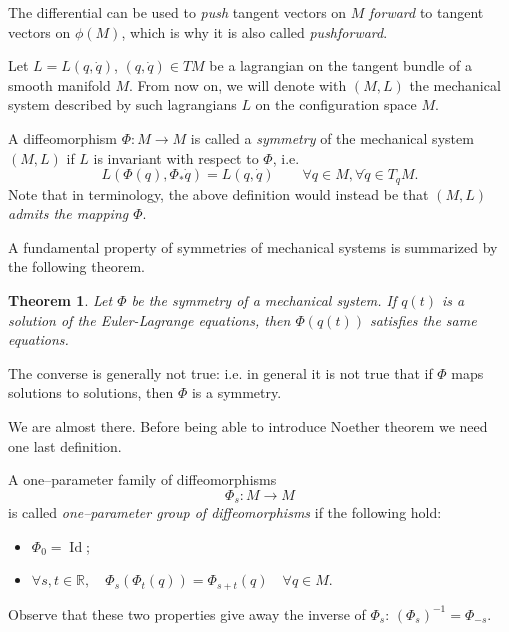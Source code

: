 \documentclass[english,fontsize=11pt,paper=a5,oneside]{scrbook}
\newcommand{\R}{\mathbb{R}}
\DeclareMathOperator{\Id}{Id}
\newtheorem{theorem}{Theorem}[chapter]
\theoremstyle{definition}
\begin{document}
The differential can be used to \emph{push} tangent vectors on $M$ \emph{forward} to tangent vectors on $\phi(M)$, which is why it is also called \emph{pushforward}.

\begin{tcolorbox}
    Let $L = L(q, \dot q)$, $(q, \dot q)\in TM$ be a lagrangian on the tangent bundle of a smooth manifold $M$. From now on, we will denote with $(M, L)$ the mechanical system described by such lagrangians $L$ on the configuration space $M$. 
\end{tcolorbox}

A diffeomorphism $\Phi: M \to M$ is called a \emph{symmetry} of the mechanical system $(M,L)$ if $L$ is invariant with respect to $\Phi$, i.e.
\begin{equation}\label{eq:symmetry}
    L\left(\Phi(q), \Phi_*\dot q\right) = L(q,\dot q) \qquad \forall q\in M, \forall\dot q \in T_q M.
\end{equation}
Note that in \cite[Chapter 4]{book:arnold} terminology, the above definition would instead be that \emph{$(M,L)$ admits the mapping $\Phi$}.

A fundamental property of symmetries of mechanical systems is summarized by the following theorem.

\begin{theorem}
    Let $\Phi$ be the symmetry of a mechanical system. If $q(t)$ is a solution of the Euler-Lagrange equations, then $\Phi(q(t))$ satisfies the same equations.
\end{theorem}

The converse is generally not true: i.e. in general it is not true that if $\Phi$ maps solutions to solutions, then $\Phi$ is a symmetry.

We are almost there.
Before being able to introduce Noether theorem we need one last definition.

A one--parameter family of diffeomorphisms
\begin{equation}
    \Phi_s : M \to M
\end{equation}
is called \emph{one--parameter group of diffeomorphisms} if the following hold:
\begin{itemize}
    \item $\Phi_0 = \Id$;
    \item $\forall s, t \in \R, \quad \Phi_s(\Phi_t(q)) = \Phi_{s+t}(q)\quad \forall q\in M$.
\end{itemize}
Observe that these two properties give away the inverse of $\Phi_s$: $(\Phi_s)^{-1} = \Phi_{-s}$.
\end{document}
